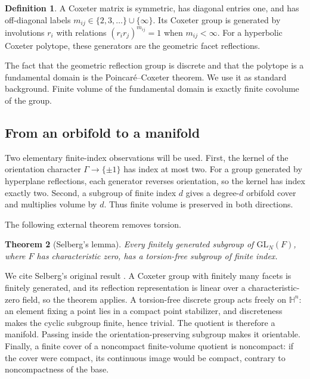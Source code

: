 \documentclass[11pt]{article}
\numberwithin{equation}{section}
\newtheorem{theorem}{Theorem}[section]
\theoremstyle{definition}
\newtheorem{definition}[theorem]{Definition}
\theoremstyle{remark}
\newcommand{\HH}{\mathbb{H}}
\begin{document}
\begin{definition}
A Coxeter matrix is symmetric, has diagonal entries one, and has off-diagonal labels
\(m_{ij}\in\{2,3,\ldots\}\cup\{\infty\}\).  Its Coxeter group is generated
by involutions \(r_i\) with relations \((r_ir_j)^{m_{ij}}=1\) when
\(m_{ij}<\infty\).  For a hyperbolic Coxeter polytope, these generators are
the geometric facet reflections.
\end{definition}

The fact that the geometric reflection group is discrete and that the
polytope is a fundamental domain is the Poincar\'e--Coxeter theorem.  We use
it as standard background.  Finite volume of the fundamental domain is
exactly finite covolume of the group.

\subsection{From an orbifold to a manifold}
\label{subsec:orbifold-manifold}

Two elementary finite-index observations will be used.  First, the kernel of
the orientation character \(\Gamma\to\{\pm1\}\) has index at most two.
For a group generated by hyperplane reflections, each generator reverses
orientation, so the kernel has index exactly two.  Second, a subgroup of
finite index \(d\) gives a degree-\(d\) orbifold cover and multiplies volume
by \(d\).  Thus finite volume is preserved in both directions.

The following external theorem removes torsion.

\begin{theorem}[Selberg's lemma]
\label{thm:selberg}
Every finitely generated subgroup of \(\mathrm{GL}_N(F)\), where \(F\) has
characteristic zero, has a torsion-free subgroup of finite index.
\end{theorem}

We cite Selberg's original result \cite{Selberg}.  A Coxeter group with
finitely many facets is finitely generated, and its reflection
representation is linear over a characteristic-zero field, so the theorem
applies.  A torsion-free discrete group acts freely on \(\HH^n\): an element
fixing a point lies in a compact point stabilizer, and discreteness makes the
cyclic subgroup finite, hence trivial.  The quotient is therefore a
manifold.  Passing inside the orientation-preserving subgroup makes it
orientable.  Finally, a finite cover of a noncompact finite-volume quotient
is noncompact: if the cover were compact, its continuous image would be
compact, contrary to noncompactness of the base.
\end{document}
